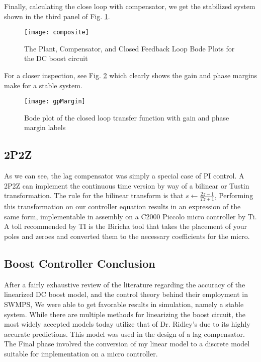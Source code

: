Finally, calculating the close loop with compensator, we get the stabilized system shown in the third panel of Fig. \ref{composite}. 

\begin{figure}[htbp]
\begin{center}
\texttt{[image: composite]}
\caption{The Plant, Compensator, and Closed Feedback Loop Bode Plots for the DC boost circuit}
\label{composite}
\end{center}
\end{figure}

For a closer inspection, see Fig. \ref{gpMargin} which clearly shows the gain and phase margins make for a stable system. 

\begin{figure}[htbp]
\begin{center}
\texttt{[image: gpMargin]}
\caption{Bode plot of the closed loop transfer function with gain and phase margin labels}
\label{gpMargin}
\end{center}
\end{figure}

\subsection{2P2Z}
As we can see, the lag compensator was simply a special case of PI control. A 2P2Z can implement the continuous time version by way of a bilinear or Tustin transformation. The rule for the bilinear transform is that $s\leftarrow\frac{2z-1}{Tz+1}$, Performing this transformation on our controller equation results in an expression of the same form, implementable in assembly on a C2000 Piccolo micro controller by Ti. A toll recommended by TI is the Biricha tool that takes the placement of your poles and zeroes and converted them to the necessary coefficients for the micro.

\subsection{Boost Controller Conclusion}
After a fairly exhaustive review of the literature regarding the accuracy of the linearized DC boost model, and the control theory behind their employment in SWMPS, We were able to get favorable results in simulation, namely a stable system. While there are multiple methods for linearizing the boost circuit, the most widely accepted models today utilize that of Dr. Ridley's due to its highly accurate predictions. This model was used in the design of a lag compensator. The Final phase involved the conversion of my linear model to a discrete model suitable for implementation on a micro controller.